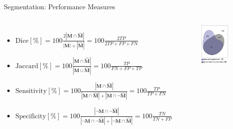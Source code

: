 \documentclass[aspectratio=169]{beamer}
\begin{document}
\begin{frame}{Segmentation: Performance Measures}

    
\begin{columns}



\begin{itemize}
    \setlength\itemsep{1em}
    \item $\text{Dice}[\%] = 100 \frac{2|\mathbf{M}  \cap \mathbf{\hat{M}} |}{|\mathbf{M} | + |\mathbf{\hat{M}} |} = 100\frac{2 TP}{2TP + FP + FN}$
    
    
    \item $\text{Jaccard}[\%] = 100\frac{|\mathbf{M}  \cap \mathbf{\hat{M}} |}{|\mathbf{M}  \cup \mathbf{\hat{M}} |} = 100\frac{TP}{FN + FP + TP} $\\
    
    \item $\text{Sensitivity}[\%] = 100\frac{|\mathbf{M}  \cap \hat{\mathbf{M}}|}{|\mathbf{M}  \cap \hat{\mathbf{M}}| + |\mathbf{M}  \cap \neg \hat{\mathbf{M}}|} = 100\frac{TP}{TP + FN}$

    \item $\text{Specificity}[\%] = 100\frac{|\neg \mathbf{M}  \cap \neg \hat{\mathbf{M}}|}{|\neg \mathbf{M}  \cap \neg \hat{\mathbf{M}}| + | \neg \mathbf{M}  \cap \hat{\mathbf{M}}|}=  100\frac{TN}{TN + FP}$


\end{itemize}
 \begin{figure}
     \centering \includegraphics[width=0.5\linewidth]{Figures/regions.pdf}
 \end{figure}
\end{columns}    

    
\end{frame}
\end{document}
